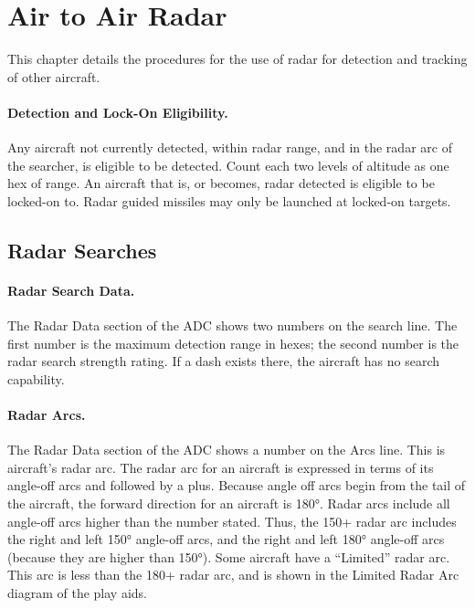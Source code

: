 \section{Air to Air Radar}

This chapter details the procedures for the use of radar for detection and tracking of other aircraft.

\paragraph{Detection and Lock-On Eligibility.} Any aircraft not currently detected, within radar range, and in the radar arc of the searcher, is eligible to be detected. Count each two levels of altitude as one hex of range. An aircraft that is, or becomes, radar detected is eligible to be locked-on to. Radar guided missiles may only be launched at locked-on targets.

\subsection{Radar Searches}

\paragraph{Radar Search Data.} The Radar Data section of the ADC shows two numbers on the search line. The first number is the maximum detection range in hexes; the second number is the radar search strength rating. If a dash exists there, the aircraft has no search capability.


\paragraph{Radar Arcs.} The Radar Data section of the ADC shows a number on the Arcs line. This is aircraft's radar arc. The radar arc for an aircraft is expressed in terms of its angle-off arcs and followed by a plus. Because angle off arcs begin from the tail of the aircraft, the forward direction for an aircraft is 180°.  Radar arcs include all angle-off arcs higher than the number stated. Thus, the 150+ radar arc includes the right and left 150° angle-off arcs, and the right and left 180° angle-off arcs (because they are higher than 150°). Some aircraft have a “Limited” radar arc. This arc is less than the 180+ radar arc, and is shown in the Limited Radar Arc diagram of the play aids. 

